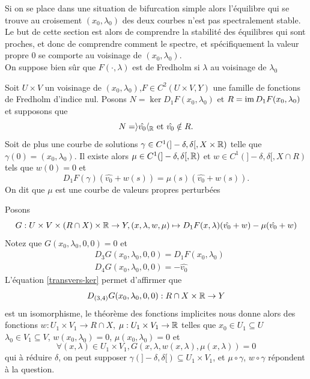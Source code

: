 \documentclass[memoire.tex]{subfiles}
\begin{document}
Si on se place dans une situation de bifurcation simple alors l'équilibre qui se trouve au croisement $(x_0,\lambda_0)$ des deux courbes n'est pas spectralement stable. Le but de cette section est alors de comprendre la stabilité des équilibres qui sont proches, et donc de comprendre comment le spectre, et spécifiquement la valeur propre $0$ se comporte au voisinage de $(x_0,\lambda_0)$.\\
On suppose bien sûr que $F(\cdot,\lambda)$ est de Fredholm si $\lambda$ au voisinage de $\lambda_0$

\begin{proposition}\label{courbe-vp}
    Soit $U\times V$ un voisinage de $(x_0,\lambda_0)$,$F\in C^2(U\times V,Y)$ une famille de fonctions de Fredholm d'indice nul.
    Posons $N=\ker D_1F(x_0,\lambda_0)$
    et $R=\operatorname{im} D_1F(x_0,\lambda_0)$ et 
    supposons que
    \begin{equation}\label{transvers-ker}
        N=\rangle \hat{v_0}\langle_{\mathbb{R}}\text{ et }\hat{v_0}\notin R.
    \end{equation}
    Soit de plus une courbe de solutions $\gamma\in C^1(]-\delta,\delta[,X\times \mathbb{R})$ telle que $\gamma(0)=(x_0,\lambda_0)$. Il existe alors $\mu\in C^1(]-\delta,\delta [, \mathbb{R})$ et $w\in C^1(]-\delta,\delta[,X\cap R)$ tels que $w(0)=0$ et
    \begin{equation}\label{perturb-vb}
        D_1F(\gamma)(\hat{v_0}+w(s))=\mu(s)(\hat{v_0}+w(s)).
    \end{equation}
    On dit que $\mu$ est une courbe de valeurs propres perturbées
\end{proposition}
\begin{preuve}
    Posons
    \begin{equation}\label{Mapping-vp}
        G: U\times V\times (R\cap X)\times \mathbb{R}\rightarrow Y, (x,\lambda,w,\mu)\mapsto D_1 F(x,\lambda)(\hat{v_0}+w)-\mu(\hat{v_0}+w)
    \end{equation}
    Notez que $G(x_0,\lambda_0,0,0)=0$ et 
    \begin{align*}
        &D_3 G(x_0,\lambda_0,0,0)=D_1 F(x_0,\lambda_0)\\
        &D_4G(x_0,\lambda_0,0,0)=-\hat{v_0}
    \end{align*}
    L'équation \ref{transvers-ker} permet d'affirmer que
    \begin{equation*}
        D_{(3,4)}G(x_0,\lambda_0,0,0): R\cap X\times \mathbb{R}\rightarrow Y
    \end{equation*}
    est un isomorphisme, le théorème des fonctions implicites nous donne alors des fonctions $w:U_1\times V_1\rightarrow R\cap X$, $\mu: U_1\times V_1\rightarrow \mathbb{R}$ telles que $x_0\in U_1\subseteq U$ $\lambda_0\in V_1\subseteq V$,  $w(x_0,\lambda_0)=0$, $\mu(x_0,\lambda_0)=0$ et 
    \begin{equation*}
        \forall (x,\lambda)\in U_1\times V_1,G(x,\lambda,w(x,\lambda),\mu(x,\lambda))=0
    \end{equation*}
    qui à réduire $\delta$, on peut supposer 
    $\gamma(]-\delta,\delta[)\subseteq U_1\times V_1$, et
    $\mu\circ \gamma$, $w\circ\gamma$ répondent à la question.
\end{preuve}
\end{document}
